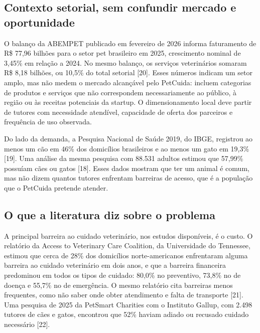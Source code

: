 \documentclass[12pt,a4paper]{article}
\begin{document}
\subsection{Contexto setorial, sem confundir mercado e oportunidade}

O balanço da ABEMPET publicado em fevereiro de 2026 informa faturamento de R\$ 77,96 bilhões para o setor pet brasileiro em 2025, crescimento nominal de 3,45\% em relação a 2024. No mesmo balanço, os serviços veterinários somaram R\$ 8,18 bilhões, ou 10,5\% do total setorial [20]. Esses números indicam um setor amplo, mas não medem o mercado alcançável pelo PetCuida: incluem categorias de produtos e serviços que não correspondem necessariamente ao público, à região ou às receitas potenciais da startup. O dimensionamento local deve partir de tutores com necessidade atendível, capacidade de oferta dos parceiros e frequência de uso observada.

Do lado da demanda, a Pesquisa Nacional de Saúde 2019, do IBGE, registrou ao menos um cão em 46\% dos domicílios brasileiros e ao menos um gato em 19,3\% [19]. Uma análise da mesma pesquisa com 88.531 adultos estimou que 57,99\% possuíam cães ou gatos [18]. Esses dados mostram que ter um animal é comum, mas não dizem quantos tutores enfrentam barreiras de acesso, que é a população que o PetCuida pretende atender.

\subsection{O que a literatura diz sobre o problema}

A principal barreira ao cuidado veterinário, nos estudos disponíveis, é o custo. O relatório da Access to Veterinary Care Coalition, da Universidade do Tennessee, estimou que cerca de 28\% dos domicílios norte-americanos enfrentaram alguma barreira ao cuidado veterinário em dois anos, e que a barreira financeira predominou em todos os tipos de cuidado: 80,0\% no preventivo, 73,8\% no de doença e 55,7\% no de emergência. O mesmo relatório cita barreiras menos frequentes, como não saber onde obter atendimento e falta de transporte [21]. Uma pesquisa de 2025 da PetSmart Charities com o Instituto Gallup, com 2.498 tutores de cães e gatos, encontrou que 52\% haviam adiado ou recusado cuidado necessário [22].
\end{document}

